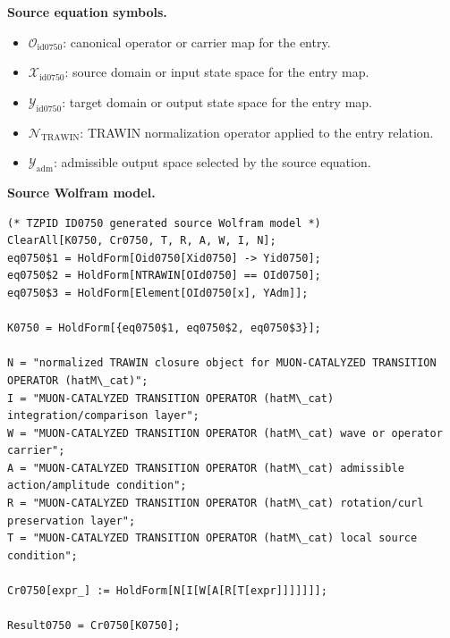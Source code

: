\begin{minipage}[t]{0.49\linewidth}
\begingroup
\small
\raggedright
\textbf{Source equation symbols.}\par
\begin{itemize}[leftmargin=1.35em,itemsep=1pt,topsep=1pt,parsep=0pt]
    \item $\mathcal{O}_{\mathrm{id0750}}$: canonical operator or carrier map for the entry.
    \item $\mathcal{X}_{\mathrm{id0750}}$: source domain or input state space for the entry map.
    \item $\mathcal{Y}_{\mathrm{id0750}}$: target domain or output state space for the entry map.
    \item $\mathcal{N}_{\mathrm{TRAWIN}}$: TRAWIN normalization operator applied to the entry relation.
    \item $\mathcal{Y}_{\mathrm{adm}}$: admissible output space selected by the source equation.
\end{itemize}
\endgroup
\end{minipage}\hfill
\begin{minipage}[t]{0.47\linewidth}
\begingroup
\scriptsize
\raggedright
\textbf{Source Wolfram model.}\par
\begin{Verbatim}[fontsize=\tiny,breaklines=true,breakanywhere=true]
(* TZPID ID0750 generated source Wolfram model *)
ClearAll[K0750, Cr0750, T, R, A, W, I, N];
eq0750$1 = HoldForm[Oid0750[Xid0750] -> Yid0750];
eq0750$2 = HoldForm[NTRAWIN[OId0750] == OId0750];
eq0750$3 = HoldForm[Element[OId0750[x], YAdm]];

K0750 = HoldForm[{eq0750$1, eq0750$2, eq0750$3}];

N = "normalized TRAWIN closure object for MUON-CATALYZED TRANSITION OPERATOR (hatM\_cat)";
I = "MUON-CATALYZED TRANSITION OPERATOR (hatM\_cat) integration/comparison layer";
W = "MUON-CATALYZED TRANSITION OPERATOR (hatM\_cat) wave or operator carrier";
A = "MUON-CATALYZED TRANSITION OPERATOR (hatM\_cat) admissible action/amplitude condition";
R = "MUON-CATALYZED TRANSITION OPERATOR (hatM\_cat) rotation/curl preservation layer";
T = "MUON-CATALYZED TRANSITION OPERATOR (hatM\_cat) local source condition";

Cr0750[expr_] := HoldForm[N[I[W[A[R[T[expr]]]]]]];

Result0750 = Cr0750[K0750];
\end{Verbatim}
\endgroup
\end{minipage}

